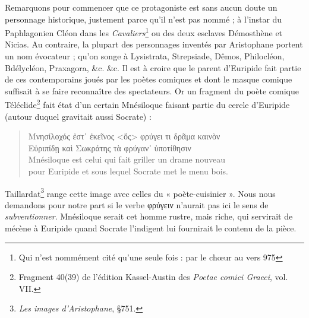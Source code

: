 \documentclass{book}%
\newcommand{\italique}[1]{\textit{#1}}%
\newcommand{\nieme}[1]{#1\italique{e}}%
\newcommand{\expo}[1]{\textsuperscript{#1}}%
\newcommand{\note}[1]{\footnote{#1}}
\newcommand{\citComm}[1]{\begin{quote}#1\end{quote}}
\begin{document}
Remarquons pour commencer que ce protagoniste est sans aucun doute un personnage historique, justement parce qu'il n'est pas nommé ; à l'instar du Paphlagonien Cléon dans les \italique{Cavaliers}\note{Qui n'est nommément cité qu'une seule fois : par le chœur au vers 975} ou des deux esclaves Démosthène et Nicias.
Au contraire, la plupart des personnages inventés par Aristophane portent un nom évocateur ; qu'on songe à Lysistrata, Strepsiade, Dêmos, Philocléon, Bdélycléon, Praxagora, \&c. \&c. 
Il est à croire que le parent d'Euripide fait partie de ces contemporains joués par les poètes comiques et dont le masque comique suffisait à se faire reconnaître des spectateurs.
Or un fragment du poète comique Téléclide\note{Fragment 40(39) de l'édition Kassel-Austin des \italique{Poetae comici Graeci}, vol. VII.} fait état d'un certain Mnésiloque faisant partie du cercle d'Euripide (autour duquel gravitait aussi Socrate) :
\citComm{Μνησίλοχός ἐστ᾽ ἐκεῖνος <ὅς> φρύγει τι δρᾶμα καινὸν\\
Εὐριπίδῃ καὶ Σωκράτης τὰ φρύγαν᾽ ὑποτίθησιν\\
Mnésiloque est celui qui fait griller un drame nouveau\\
pour Euripide et sous lequel Socrate met le menu bois.}
Taillardat\note{\italique{Les images d'Aristophane}, §751.} range cette image avec celles du « poète-cuisinier ». 
Nous nous demandons pour notre part si le verbe φρύγειν n'aurait pas ici le sens de \italique{subventionner}. Mnésiloque serait cet homme rustre, mais riche, qui servirait de mécène à Euripide quand Socrate l'indigent lui fournirait le contenu de la pièce.%
\end{document}
